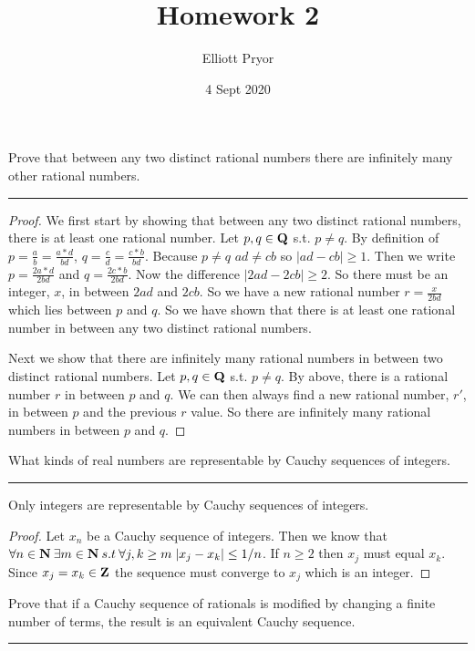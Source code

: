 \documentclass[11pt]{article}
\title{Homework 2}
\author{Elliott Pryor}
\date{4 Sept 2020}
\begin{document}
\maketitle

Prove that between any two distinct rational numbers there are infinitely many other rational numbers.
\hrule

\begin{proof}
We first start by showing that between any two distinct rational numbers, there is at least one rational number. Let $p, q \in \mathbf{Q}$ s.t. $p \neq q$. By definition of $p = \frac{a}{b} = \frac{a * d}{bd}$, $q = \frac{c}{d} = \frac{ c * b}{bd}$. Because $p \neq q$ $ad \neq cb$ so $|ad - cb| \geq 1$. Then we write $p = \frac{2a * d}{2bd}$ and $q = \frac{2 c * b}{2bd}$. Now the difference $|2ad - 2 cb| \geq 2$. So there must be an integer, $x$, in between $2ad$ and $2cb$.  So we have a new rational number $r = \frac{x}{2bd}$ which lies between $p$ and $q$. So we have shown that there is at least one rational number in between any two distinct rational numbers.

Next we show that there are infinitely many rational numbers in between two distinct rational numbers. Let $p, q \in \mathbf{Q}$ s.t. $p \neq q$. By above, there is a rational number $r$ in between $p$ and $q$. We can then always find a new rational number, $r'$, in between $p$ and the previous $r$ value. So there are infinitely many rational numbers in between $p$ and $q$.

\end{proof}

What kinds of real numbers are representable by Cauchy sequences of integers.
\hrule

Only integers are representable by Cauchy sequences of integers. 

\begin{proof} 

Let $x_n$ be a Cauchy sequence of integers. Then we know that $\forall n \in \mathbf{N} \: \exists m \in \mathbf{N} \: s.t \: \forall j,k \geq m \; |x_j - x_k| \leq 1/n$. If $n \geq 2$ then $x_j$ must equal $x_k$. Since $x_j = x_k \in \mathbf{Z}$ the sequence must converge to $x_j$ which is an integer.
\end{proof}

Prove that if a Cauchy sequence of rationals is modified by changing a finite number of terms, the result is an equivalent Cauchy sequence.
\hrule
\end{document}

